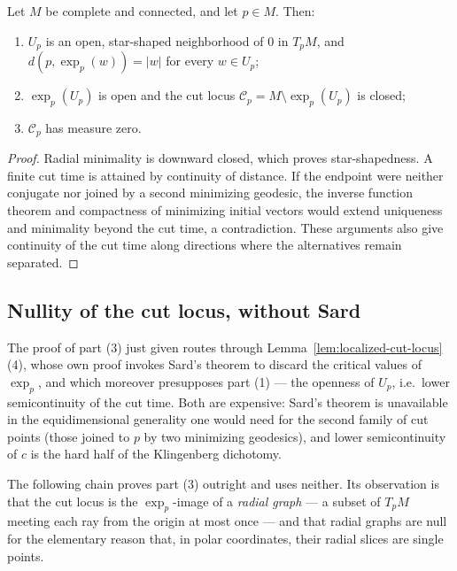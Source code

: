 \begin{lemma}
\label{lem:cut-locus-properties}



Let $M$ be complete and connected, and let $p\in M$. Then:
\begin{enumerate}
\item $U_p$ is an open, star-shaped neighborhood of $0$ in
$T_pM$, and $d(p,\exp_p(w))=|w|$ for every $w\in U_p$;
\item $\exp_p(U_p)$ is open and the cut locus
${\mathcal C}_p=M\setminus\exp_p(U_p)$ is closed;
\item ${\mathcal C}_p$ has measure zero.
\end{enumerate}
\end{lemma}

\begin{proof}
\sketch
{}
Radial minimality is downward closed, which proves star-shapedness. A finite cut time is attained by continuity of distance. If the endpoint were neither conjugate nor joined by a second minimizing geodesic, the inverse function theorem and compactness of minimizing initial vectors would extend uniqueness and minimality beyond the cut time, a contradiction. These arguments also give continuity of the cut time along directions where the alternatives remain separated.
\end{proof}

\subsection*{Nullity of the cut locus, without Sard}

The proof of part (3) just given routes through
Lemma~\ref{lem:localized-cut-locus}(4), whose own proof invokes Sard's
theorem to discard the critical values of $\exp_p$, and which
moreover presupposes part (1) --- the openness of $U_p$, i.e.\ lower
semicontinuity of the cut time. Both are expensive: Sard's theorem is
unavailable in the equidimensional generality one would need for the
second family of cut points (those joined to $p$ by two minimizing
geodesics), and lower semicontinuity of $c$ is the hard half of the
Klingenberg dichotomy.

The following chain proves part (3) outright and uses neither. Its
observation is that the cut locus is the $\exp_p$-image of a
\emph{radial graph} --- a subset of $T_pM$ meeting each ray from the
origin at most once --- and that radial graphs are null for the
elementary reason that, in polar coordinates, their radial slices are
single points.

